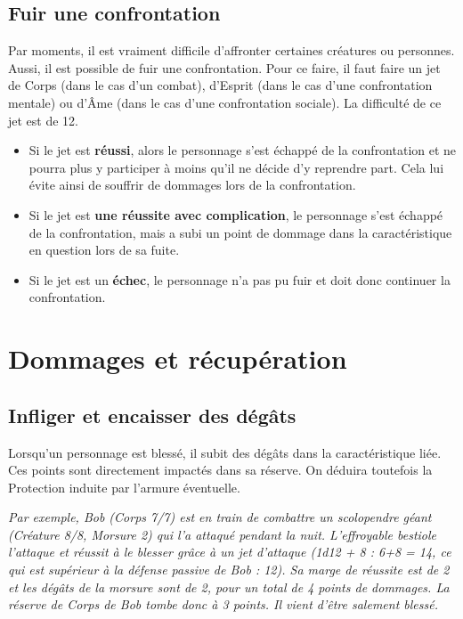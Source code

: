 \documentclass[a4paper,10pt,twoside,twocolumn,openany,bg=print]{dndbook}
\begin{document}
\subsection*{Fuir une confrontation}

Par moments, il est vraiment difficile d'affronter certaines créatures ou personnes. Aussi, il est possible de fuir une confrontation. Pour ce faire, il faut faire un jet de Corps (dans le cas d'un combat), d'Esprit (dans le cas d'une confrontation mentale) ou d'Âme (dans le cas d'une confrontation sociale). La difficulté de ce jet est de 12.

\begin{itemize}
\item Si le jet est \textbf{réussi}, alors le personnage s'est échappé de la confrontation et ne pourra plus y participer à moins qu'il ne décide d'y reprendre part. Cela lui évite ainsi de souffrir de dommages lors de la confrontation.
\item Si le jet est \textbf{une réussite avec complication}, le personnage s'est échappé de la confrontation, mais a subi un point de dommage dans la caractéristique en question lors de sa fuite.
\item Si le jet est un \textbf{échec}, le personnage n'a pas pu fuir et doit donc continuer la confrontation.
\end{itemize}

\section{Dommages et récupération}

\subsection*{Infliger et encaisser des dégâts}

Lorsqu'un personnage est blessé, il subit des dégâts dans la caractéristique liée. Ces points sont directement impactés dans sa réserve. On déduira toutefois la Protection induite par l'armure éventuelle.

\emph{Par exemple, Bob (Corps 7/7) est en train de combattre un scolopendre géant (Créature 8/8, Morsure 2) qui l'a attaqué pendant la nuit. L'effroyable bestiole l'attaque et réussit à le blesser grâce à un jet d'attaque (1d12 + 8 : 6+8 = 14, ce qui est supérieur à la défense passive de Bob : 12). Sa marge de réussite est de 2 et les dégâts de la morsure sont de 2, pour un total de 4 points de dommages. La réserve de Corps de Bob tombe donc à 3 points. Il vient d'être salement blessé.}
\end{document}
